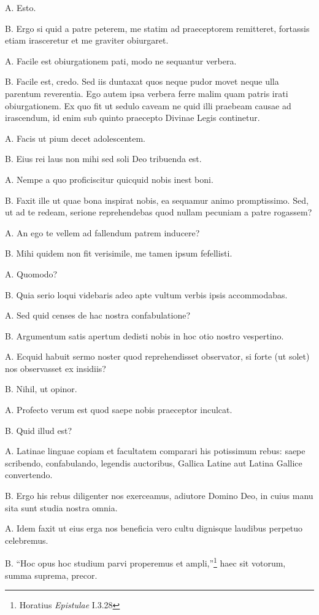 \documentclass{article}
\begin{document}
A. Esto.

B. Ergo si quid a patre peterem, me statim ad praeceptorem remitteret, fortassis etiam irasceretur et me graviter obiurgaret.

A. Facile est obiurgationem pati, modo ne sequantur verbera.

B. Facile est, credo. Sed iis duntaxat quos neque pudor movet neque ulla parentum reverentia. Ego autem ipsa verbera ferre malim quam patris irati obiurgationem. Ex quo fit ut sedulo caveam ne quid illi praebeam causae ad irascendum, id enim sub quinto praecepto Divinae Legis continetur.

A. Facis ut pium decet adolescentem.

B. Eius rei laus non mihi sed soli Deo tribuenda est.

A. Nempe a quo proficiscitur quicquid nobis inest boni.

B. Faxit ille ut quae bona inspirat nobis, ea sequamur animo promptissimo. Sed, ut ad te redeam, serione reprehendebas quod nullam pecuniam a patre rogassem?

A. An ego te vellem ad fallendum patrem inducere?

B. Mihi quidem non fit verisimile, me tamen ipsum fefellisti.

A. Quomodo?

B. Quia serio loqui videbaris adeo apte vultum verbis ipsis accommodabas.

A. Sed quid censes de hac nostra confabulatione?

B. Argumentum satis apertum dedisti nobis in hoc otio nostro vespertino.

A. Ecquid habuit sermo noster quod reprehendisset observator, si forte (ut solet) nos observasset ex insidiis?

B. Nihil, ut opinor.

A. Profecto verum est quod saepe nobis praeceptor inculcat.

B. Quid illud est?

A. Latinae linguae copiam et facultatem comparari his potissimum rebus: saepe scribendo, confabulando, legendis auctoribus, Gallica Latine aut Latina Gallice convertendo.

B. Ergo his rebus diligenter nos exerceamus, adiutore Domino Deo, in cuius manu sita sunt studia nostra omnia.

A. Idem faxit ut eius erga nos beneficia vero cultu dignisque laudibus perpetuo celebremus.

B. ``Hoc opus hoc studium parvi properemus et ampli,''\footnote{Horatius \emph{Epistulae} I.3.28} haec sit votorum, summa suprema, precor.
\end{document}
